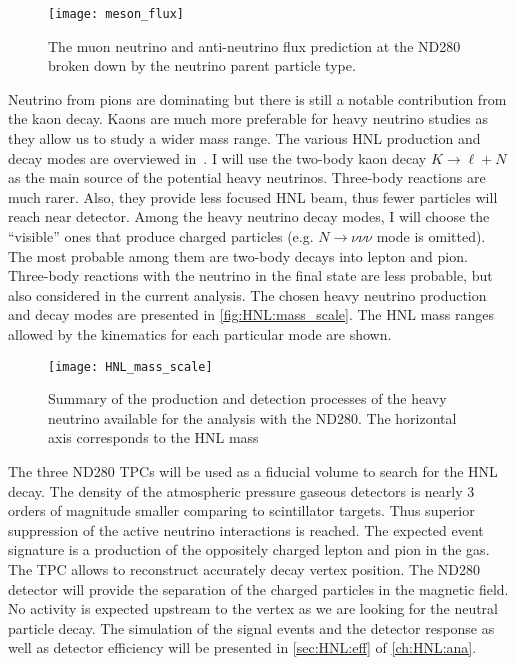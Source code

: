 \documentclass[../main.tex]{subfiles}
\begin{document}
\begin{figure}[!ht]
    \centering
    \texttt{[image: meson\_flux]}
    \caption{The muon neutrino and anti-neutrino flux prediction at the ND280 broken down by the neutrino parent particle type.}
    \label{fig:HNL:meson_flux}
\end{figure}

Neutrino from pions are dominating but there is still a notable contribution from the kaon decay. Kaons are much more preferable for heavy neutrino studies as they allow us to study a wider mass range. The various HNL production and decay modes are overviewed in~\cite{Gorbunov2007}. I will use the two-body kaon decay $K\to\ell+N$ as the main source of the potential heavy neutrinos. Three-body reactions are much rarer. Also, they provide less focused HNL beam, thus fewer particles will reach near detector. Among the heavy neutrino decay modes, I will choose the ``visible'' ones that produce charged particles (e.g. $N\to\nu\nu\nu$ mode is omitted). The most probable among them are two-body decays into lepton and pion. Three-body reactions with the neutrino in the final state are less probable, but also considered in the current analysis. The chosen heavy neutrino production and decay modes are presented in \autoref{fig:HNL:mass_scale}. The HNL mass ranges allowed by the kinematics for each particular mode are shown.

\begin{figure}[!ht]
    \centering
    \texttt{[image: HNL\_mass\_scale]}
    \caption{Summary of the production and detection processes of the heavy neutrino available for the analysis with the ND280. The horizontal axis corresponds to the HNL mass}
    \label{fig:HNL:mass_scale}
\end{figure}

The three ND280 TPCs will be used as a fiducial volume to search for the HNL decay. The density of the atmospheric pressure gaseous detectors is nearly 3 orders of magnitude smaller comparing to scintillator targets. Thus superior suppression of the active neutrino interactions is reached. The expected event signature is a production of the oppositely charged lepton and pion in the gas. The TPC allows to reconstruct accurately decay vertex position. The ND280 detector will provide the separation of the charged particles in the magnetic field. No activity is expected upstream to the vertex as we are looking for the neutral particle decay. The simulation of the signal events and the detector response as well as detector efficiency will be presented in \autoref{sec:HNL:eff} of \autoref{ch:HNL:ana}.
\end{document}
